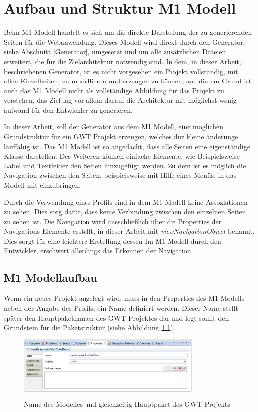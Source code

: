 \chapter{Aufbau und Struktur M1 Modell} \label{M1Modell}
Beim M1 Modell handelt es sich um die direkte Darstellung der zu generierenden
Seiten für die Webanwendung. Dieses Modell wird direkt durch den Generator,
siehe Abschnitt \ref{Generator}, umgesetzt und um alle zusätzlichen Dateien
erweitert, die für die Zielarchitektur notwendig sind. In dem, in dieser Arbeit,
beschriebenen Generator, ist es nicht vorgesehen ein Projekt vollständig, mit allen Einzelheiten, zu modellieren und
erzeugen zu können, aus diesem Grund ist auch das M1 Modell nicht als
vollständige Abbildung für das Projekt zu verstehen, das Ziel lag vor allem
darauf die Architektur mit möglichst wenig aufwand für den Entwickler zu generieren.

In dieser Arbeit, soll der Generator aus dem M1 Modell, eine möglichen
Grundstruktur für ein GWT Projekt erzeugen, welches dur kleine änderunge
lauffähig ist. Das M1 Modell ist so angedacht, dass alle Seiten eine
eigenständige Klasse darstellen. Des Weiteren können einfache Elemente, wie
Beispielsweise Label und Textfelder den Seiten hinzugefügt werden.
Zu dem ist es möglich die Navigation zwischen den Seiten, beispielsweise mit
Hilfe eines Menüs, in das Modell mit einzubringen. 

Durch die Verwendung eines Profils sind in dem M1 Modell keine Assoziationen
zu sehen. Dies sorg dafür, dass keine Verbindung zwischen den einzelnen Seiten
zu sehen ist. Die Navigation wird ausschließlich über die Properties der
Navigations Elemente erstellt, in dieser Arbeit mit
\textit{viewNavigationObject} benannt. Dies sorgt für eine leichtere Erstellung
dessen Im M1 Modell durch den Entwickler, erschwert allerdings das Erkennen
der Navigation.

\section{M1 Modellaufbau}
Wenn ein neues Projekt angelegt wird, muss in den Properties des M1 Modells
neben der Angabe des Profils, ein Name definiert werden. Dieser Name stellt
später den Hauptpaketnamen des GWT Projektes dar und legt somit den Grundstein
für die Paketstruktur (siehe Abbildung \ref{Fig:mainpackage}).

\begin{figure}[htbp]
\begin{center}
\includegraphics[width=0.8\textwidth]{./img/ProjectPackage.png}
\caption{Name des Modelles und gleichzeitig Hauptpaket des
GWT Projekts}\label{Fig:mainpackage}
\end{center}
\end{figure}

